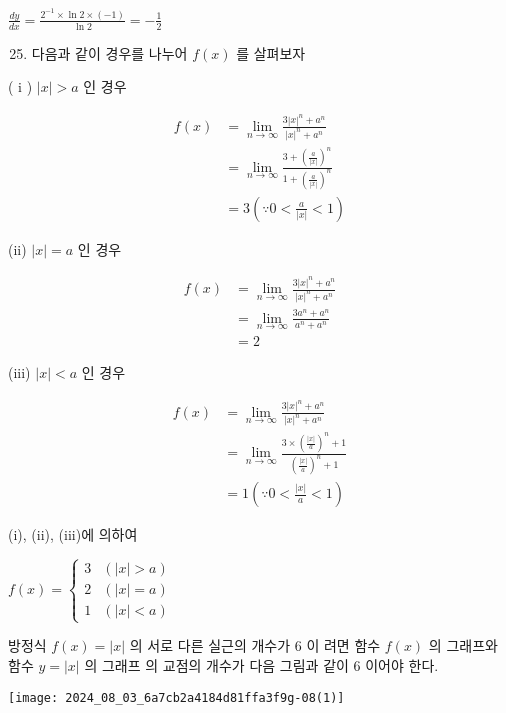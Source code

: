 \documentclass[10pt]{article}
\begin{document}
\(\frac{d y}{d x}=\frac{2^{-1} \times \ln 2 \times(-1)}{\ln 2}=-\frac{1}{2}\)

\begin{enumerate}
  \setcounter{enumi}{24}
  \item 다음과 같이 경우를 나누어 \(f(x)\) 를 살펴보자
\end{enumerate}

( i ) \(|x|>a\) 인 경우

\[
\begin{aligned}
f(x) & =\lim _{n \rightarrow \infty} \frac{3|x|^{n}+a^{n}}{|x|^{n}+a^{n}} \\
& =\lim _{n \rightarrow \infty} \frac{3+\left(\frac{a}{|x|}\right)^{n}}{1+\left(\frac{a}{|x|}\right)^{n}} \\
& =3\left(\because 0<\frac{a}{|x|}<1\right)
\end{aligned}
\]

(ii) \(|x|=a\) 인 경우

\[
\begin{aligned}
f(x) & =\lim _{n \rightarrow \infty} \frac{3|x|^{n}+a^{n}}{|x|^{n}+a^{n}} \\
& =\lim _{n \rightarrow \infty} \frac{3 a^{n}+a^{n}}{a^{n}+a^{n}} \\
& =2
\end{aligned}
\]

(iii) \(|x|<a\) 인 경우

\[
\begin{aligned}
f(x) & =\lim _{n \rightarrow \infty} \frac{3|x|^{n}+a^{n}}{|x|^{n}+a^{n}} \\
& =\lim _{n \rightarrow \infty} \frac{3 \times\left(\frac{|x|}{a}\right)^{n}+1}{\left(\frac{|x|}{a}\right)^{n}+1} \\
& =1\left(\because 0<\frac{|x|}{a}<1\right)
\end{aligned}
\]

(i), (ii), (iii)에 의하여

\(f(x)= \begin{cases}3 & (|x|>a) \\ 2 & (|x|=a) \\ 1 & (|x|<a)\end{cases}\)

방정식 \(f(x)=|x|\) 의 서로 다른 실근의 개수가 6 이 려면 함수 \(f(x)\) 의 그래프와 함수 \(y=|x|\) 의 그래프 의 교점의 개수가 다음 그림과 같이 6 이어야 한다.

\begin{center}
\texttt{[image: 2024\_08\_03\_6a7cb2a4184d81ffa3f9g-08(1)]}
\end{center}
\end{document}
